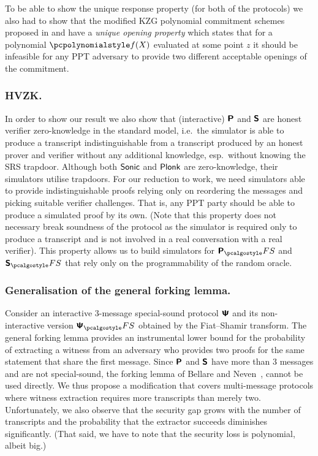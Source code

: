 \documentclass[runningheads,10pt]{llncs}
\begin{document}
To be able to show the unique response property (for both of the protocols) we
also had to show that the modified KZG polynomial commitment schemes
\cite{AC:KatZavGol10} proposed in \cite{EPRINT:GabWilCio19} and
\cite{CCS:MBKM19} have a \emph{unique opening property} which states that for a
polynomial $\p{f}(X)$ evaluated at some point $z$ it should be infeasible for
any PPT adversary to provide two different acceptable openings
of the commitment.

\subsubsection{HVZK.}%
In order to show our result we also show that (interactive) $\bm{\mathsf{P}}$ and
$\bm{\mathsf{S}}$ are honest verifier zero-knowledge in the standard model, i.e.~the
simulator is able to produce a transcript indistinguishable from a transcript
produced by an honest prover and verifier without any additional knowledge,
esp.~without knowing the SRS trapdoor. Although both ${\textnormal{\textsf{Sonic}}}$ and $\textnormal{\textsf{Plonk}}$ are
zero-knowledge, their simulators utilise trapdoors. For our reduction to work,
we need simulators able to provide indistinguishable proofs relying only on
reordering the messages and picking suitable verifier challenges. That is, any
PPT party should be able to produce a simulated proof by its own. (Note that
this property does not necessary break soundness of the protocol as the
simulator is required only to produce a transcript and is not involved in a real
conversation with a real verifier). This property allows us to build simulators
for $\plonkprotfs$ and $\sonicprotfs$ that rely only on the programmability of
the random oracle.

\subsubsection{Generalisation of the general forking lemma.}%
Consider an interactive $3$-message special-sound protocol $\bm{\mathsf{\Psi}}$ and its
non-interactive version $\ps_\fs$ obtained by the Fiat--Shamir transform. The
general forking lemma provides an instrumental lower bound for the probability
of extracting a witness from an adversary who provides two proofs for the same
statement that share the first message. Since $\bm{\mathsf{P}}$ and $\bm{\mathsf{S}}$ have
more than $3$ messages and are not special-sound, the forking lemma of Bellare
and Neven~\cite{CCS:BelNev06}, cannot be used directly. We thus propose a
modification that covers multi-message protocols where witness extraction
requires more transcripts than merely two.  Unfortunately, we also observe that
the security gap grows with the number of transcripts and the probability that
the extractor succeeds diminishes significantly. (That said, we have to note
that the security loss is polynomial, albeit big.)
\end{document}
